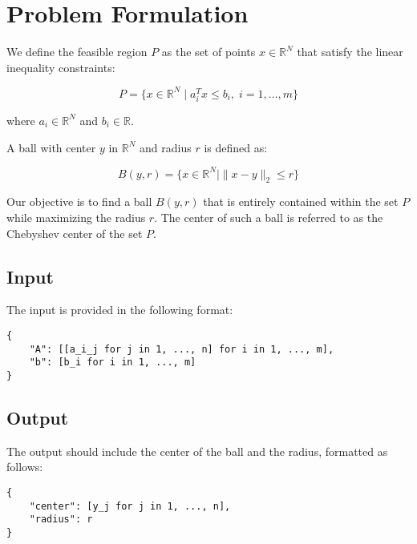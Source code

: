 \documentclass{article}
\begin{document}
\section*{Problem Formulation}

We define the feasible region \( P \) as the set of points \( x \in \mathbb{R}^N \) that satisfy the linear inequality constraints:

\[
P = \{ x \in \mathbb{R}^N \mid a_i^T x \leq b_i, \; i = 1, \ldots, m \}
\]

where \( a_i \in \mathbb{R}^N \) and \( b_i \in \mathbb{R} \).

A ball with center \( y \) in \( \mathbb{R}^N \) and radius \( r \) is defined as:

\[
B(y, r) = \{ x \in \mathbb{R}^N \mid \| x - y \|_2 \leq r \}
\]

Our objective is to find a ball \( B(y, r) \) that is entirely contained within the set \( P \) while maximizing the radius \( r \). The center of such a ball is referred to as the Chebyshev center of the set \( P \).

\subsection*{Input}

The input is provided in the following format:

\begin{verbatim}
{
    "A": [[a_i_j for j in 1, ..., n] for i in 1, ..., m],
    "b": [b_i for i in 1, ..., m]
}
\end{verbatim}

\subsection*{Output}

The output should include the center of the ball and the radius, formatted as follows:

\begin{verbatim}
{
    "center": [y_j for j in 1, ..., n],
    "radius": r
}
\end{verbatim}
\end{document}
